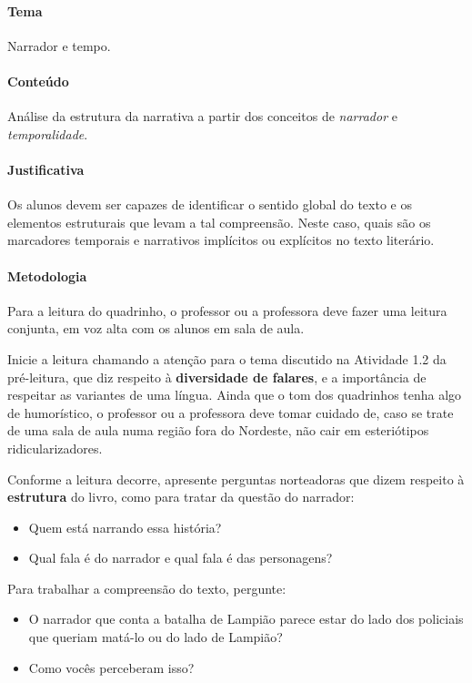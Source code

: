\documentclass[11pt]{extarticle}
\begin{document}
\paragraph{Tema} Narrador e tempo.


\paragraph{Conteúdo} Análise da estrutura da narrativa a partir dos conceitos de \textit{narrador} e \textit{temporalidade}.


\paragraph{Justificativa} Os alunos devem ser capazes de identificar o sentido global do texto
e os elementos estruturais que levam a tal compreensão. Neste caso, quais são os marcadores temporais 
e narrativos implícitos ou explícitos no texto literário. 


\paragraph{Metodologia} Para a leitura do quadrinho, o professor ou a professora deve fazer uma leitura conjunta, 
em voz alta com os alunos em sala de aula.


Inicie a leitura chamando a atenção para o tema discutido na Atividade 1.2 da pré-leitura,
que diz respeito à \textbf{diversidade de falares}, e a importância de respeitar as variantes de uma língua. Ainda que o tom dos quadrinhos tenha algo de humorístico,
o professor ou a professora deve tomar cuidado de, caso se trate de uma sala de aula
numa região fora do Nordeste, não cair em esteriótipos ridicularizadores.

Conforme a leitura decorre, apresente perguntas norteadoras que dizem respeito à \textbf{estrutura}
do livro, como para tratar da questão do narrador:

\begin{itemize}
\item Quem está narrando essa história? 
\item Qual fala é do narrador e qual fala é das personagens?
\end{itemize}

Para trabalhar a compreensão do texto, pergunte:

\begin{itemize}
\item O narrador que conta a batalha de Lampião parece estar do lado dos policiais que queriam matá-lo
ou do lado de Lampião? 
\item Como vocês perceberam isso?
\end{itemize}
\end{document}
